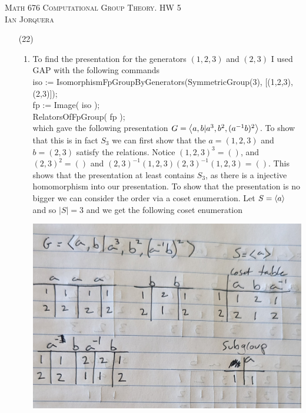 \documentclass[12pt]{amsart}
\begin{document}
\begin{center}
   \textsc{Math 676 Computational Group Theory. HW 5\\ Ian Jorquera}
\end{center}
\vspace{1em}

\begin{itemize}
   \item[(22)]
   \begin{enumerate}[label= (\alph*)]
    \item To find the presentation for the generators $(1,2,3)$ and $(2,3)$
     I used GAP with the following commands\\
    

   iso := IsomorphismFpGroupByGenerators(SymmetricGroup(3), [(1,2,3), (2,3)]);\\
   fp := Image( iso );\\
   RelatorsOfFpGroup( fp );\\

   which gave the following presentation $G=\left\langle a,b|a^3,b^2,(a^{-1}b)^2 \right\rangle$. 
   To show that this is in fact $S_3$ we can first show 
   that the $a=(1,2,3)$ and $b=(2,3)$ satisfy the relations. 
   Notice $(1,2,3)^3=()$, and $(2,3)^2=()$ and $(2,3)^{-1}(1,2,3)(2,3)^{-1}(1,2,3)=()$. 
   This shows that the presentation at least contains $S_3$, as 
   there is a injective homomorphism into our presentation. 
   To show that the presentation is no bigger we can consider the order via a coset enumeration.
   Let $S=\left\langle a \right\rangle$ and so $|S|=3$ and we get the following coset enumeration

\includegraphics[scale=.15]{676parta.jpg}



\end{enumerate}
\end{itemize}
\end{document}
